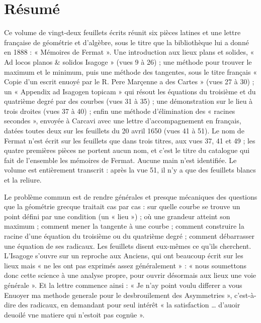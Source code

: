 \documentclass[11pt,a4paper]{article}
\begin{document}
\section*{Résumé}

\begin{resume}
Ce volume de vingt-deux feuillets écrits réunit six pièces latines et une
lettre française de géométrie et d'algèbre, sous le titre que la bibliothèque
lui a donné en 1888 : « Mémoires de Fermat ». Une introduction aux lieux plans
et solides, « Ad locos planos \& solidos Isagoge » (vues 9 à 26) ; une méthode
pour trouver le maximum et le minimum, puis une méthode des tangentes, sous le
titre français « Copie d'un escrit enuoyé par le R. Pere Marçenne a des Cartes »
(vues 27 à 30) ; un « Appendix ad Isagogen topicam » qui résout les équations du
troisième et du quatrième degré par des courbes (vues 31 à 35) ; une
démonstration sur le lieu à trois droites (vues 37 à 40) ; enfin une méthode
d'élimination des « racines secondes », envoyée à Carcavi avec une lettre
d'accompagnement en français, datées toutes deux sur les feuillets du 20 avril
1650 (vues 41 à 51). Le nom de Fermat n'est écrit sur les feuillets que dans
trois titres, aux vues 37, 41 et 49 ; les quatre premières pièces ne portent
aucun nom, et c'est le titre du catalogue qui fait de l'ensemble les mémoires
de Fermat. Aucune main n'est identifiée. Le volume est entièrement transcrit :
après la vue 51, il n'y a que des feuillets blancs et la reliure.

Le problème commun est de rendre générales et presque mécaniques des questions
que la géométrie grecque traitait cas par cas : sur quelle courbe se trouve un
point défini par une condition (un « lieu ») ; où une grandeur atteint son
maximum ; comment mener la tangente à une courbe ; comment construire la racine
d'une équation du troisième ou du quatrième degré ; comment débarrasser une
équation de ses radicaux. Les feuillets disent eux-mêmes ce qu'ils cherchent.
L'Isagoge s'ouvre sur un reproche aux Anciens, qui ont beaucoup écrit sur les
lieux mais « ne les ont pas exprimés assez généralement » : « nous soumettons
donc cette science à une analyse propre, pour ouvrir désormais aux lieux une
voie générale ». Et la lettre commence ainsi : « Je n'ay point voulu differer a
vous Enuoyer ma methode generale pour le desbrouilement des Asymmetries »,
c'est-à-dire des radicaux, en demandant pour seul intérêt « la satisfaction …
d'auoir deuoilé vne matiere qui n'estoit pas cognüe ».


\end{resume}
\end{document}
